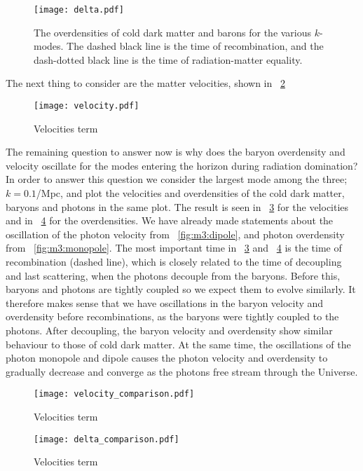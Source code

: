     \begin{figure}
        \texttt{[image: delta.pdf]}
        \caption{The overdensities of cold dark matter and barons for the various $k$-modes. The dashed black line is the time of recombination, and the dash-dotted black line is the time of radiation-matter equality.}
        \label{fig:m3:delta}
    \end{figure}

    The next thing to consider are the matter velocities, shown in ~\cref{fig:m3:velocity}

    \begin{figure}
        \texttt{[image: velocity.pdf]}
        \caption{Velocities term}
        \label{fig:m3:velocity}
    \end{figure}

    The remaining question to answer now is why does the baryon overdensity and velocity oscillate for the modes entering the horizon during radiation domination? In order to answer this question we consider the largest mode among the three; $k=0.1$/Mpc, and plot the velocities and overdensities of the cold dark matter, baryons and photons in the same plot. The result is seen in ~\cref{fig:m3:velocity_comparison} for the velocities and in ~\cref{fig:m3:delta_comparison} for the overdensities. We have already made statements about the oscillation of the photon velocity from ~\cref{fig:m3:dipole}, and photon overdensity from ~\cref{fig:m3:monopole}. The most important time in ~\cref{fig:m3:velocity_comparison} and ~\cref{fig:m3:delta_comparison} is the time of recombination (dashed line), which is closely related to the time of decoupling and last scattering, when the photons decouple from the baryons. Before this, baryons and photons are tightly coupled so we expect them to evolve similarly. It therefore makes sense that we have oscillations in the baryon velocity and overdensity before recombinations, as the baryons were tightly coupled to the photons. After decoupling, the baryon velocity and overdensity show similar behaviour to those of cold dark matter. At the same time, the oscillations of the photon monopole and dipole causes the photon velocity and overdensity to gradually decrease and converge as the photons free stream through the Universe. 

    \begin{figure}
        \texttt{[image: velocity\_comparison.pdf]}
        \caption{Velocities term}
        \label{fig:m3:velocity_comparison}
    \end{figure}

    \begin{figure}
        \texttt{[image: delta\_comparison.pdf]}
        \caption{Velocities term}
        \label{fig:m3:delta_comparison}
    \end{figure}

